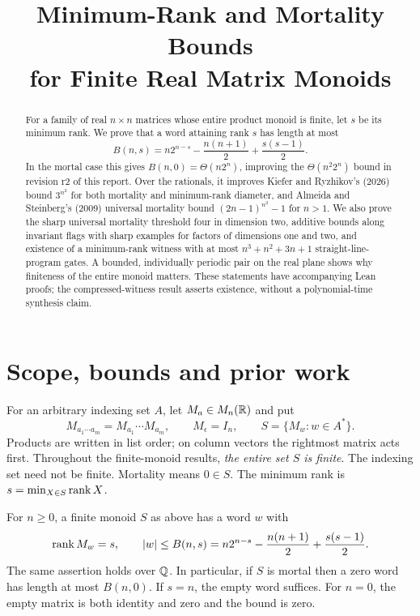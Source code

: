 
\newcommand{\sourcecredit}{Source: \href{https://github.com/egilburg/aimath}{github.com/egilburg/aimath}}
\title{Minimum-Rank and Mortality Bounds\\for Finite Real Matrix Monoids}

\maketitle

\begin{abstract}
For a family of real \(n\times n\) matrices whose entire product monoid is finite, let \(s\) be its minimum rank. We prove that a word attaining rank \(s\) has length at most
\[
 B(n,s)=n2^{n-s}-\frac{n(n+1)}2+\frac{s(s-1)}2.
\]
In the mortal case this gives \(B(n,0)=\Theta(n2^n)\), improving the \(\Theta(n^2 2^n)\) bound in revision r2 of this report. Over the rationals, it improves Kiefer and Ryzhikov's (2026) bound \(3^{n^2}\) for both mortality and minimum-rank diameter, and Almeida and Steinberg's (2009) universal mortality bound \((2n-1)^{n^2}-1\) for \(n>1\). We also prove the sharp universal mortality threshold four in dimension two, additive bounds along invariant flags with sharp examples for factors of dimensions one and two, and existence of a minimum-rank witness with at most \(n^3+n^2+3n+1\) straight-line-program gates. A bounded, individually periodic pair on the real plane shows why finiteness of the entire monoid matters. These statements have accompanying Lean proofs; the compressed-witness result asserts existence, without a polynomial-time synthesis claim.
\end{abstract}

\section{Scope, bounds and prior work}
For an arbitrary indexing set \(A\), let \(M_a\in M_n(\mathbb R)\) and put
\[
 M_{a_1\cdots a_m}=M_{a_1}\cdots M_{a_m},\qquad M_\epsilon=I_n,
 \qquad S=\{M_w:w\in A^*\}.
\]
Products are written in list order; on column vectors the rightmost matrix acts first. Throughout the finite-monoid results, \emph{the entire set \(S\) is finite}. The indexing set need not be finite. Mortality means \(0\in S\). The minimum rank is \(s=\min_{X\in S}\operatorname{rank} X\).

\begin{theorem}\label{thm:main}
For \(n\geq 0\), a finite monoid \(S\) as above has a word \(w\) with
\[
 \operatorname{rank} M_w=s,\qquad |w|\leq B(n,s)
 =n2^{n-s}-\frac{n(n+1)}2+\frac{s(s-1)}2.
\]
The same assertion holds over \(\mathbb Q\). In particular, if \(S\) is mortal then a zero word has length at most \(B(n,0)\). If \(s=n\), the empty word suffices. For \(n=0\), the empty matrix is both identity and zero and the bound is zero.
\end{theorem}

